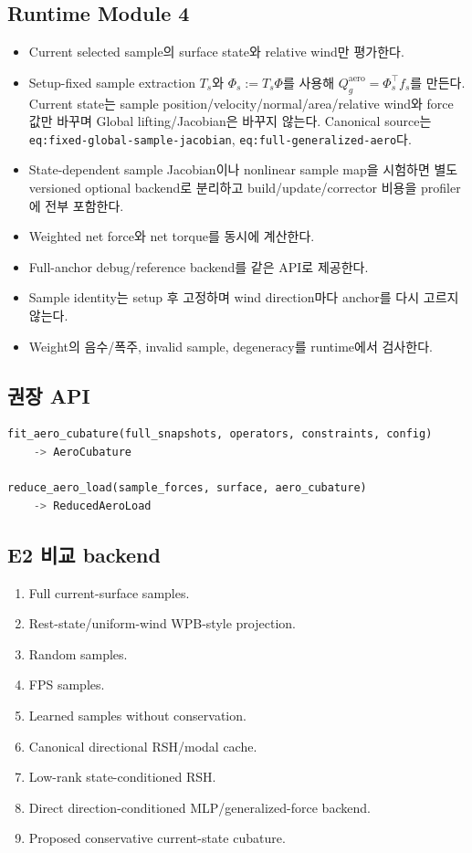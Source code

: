 \documentclass[10pt,a4paper]{article}
\newcommand{\todo}{\textcolor{TodoGray}{\(\square\)}}
\newcommand{\code}[1]{\texttt{#1}}
\begin{document}
\subsection*{Runtime Module 4}

\begin{itemize}
  \item[\todo] Current selected sample의 surface state와 relative wind만 평가한다.
  \item[\todo] Setup-fixed sample extraction \(T_s\)와
  \(\Phi_s:=T_s\Phi\)를 사용해 \(Q_g^{\mathrm{aero}}=\Phi_s^\top f_s\)를 만든다.
  Current state는 sample position/velocity/normal/area/relative wind와 force 값만 바꾸며
  Global lifting/Jacobian은 바꾸지 않는다. Canonical source는
  \code{eq:fixed-global-sample-jacobian}, \code{eq:full-generalized-aero}다.
  \item[\todo] State-dependent sample Jacobian이나 nonlinear sample map을 시험하면
  별도 versioned optional backend로 분리하고 build/update/corrector 비용을 profiler에 전부 포함한다.
  \item[\todo] Weighted net force와 net torque를 동시에 계산한다.
  \item[\todo] Full-anchor debug/reference backend를 같은 API로 제공한다.
  \item[\todo] Sample identity는 setup 후 고정하며 wind direction마다 anchor를 다시 고르지 않는다.
  \item[\todo] Weight의 음수/폭주, invalid sample, degeneracy를 runtime에서 검사한다.
\end{itemize}

\subsection*{권장 API}

\begin{lstlisting}[language=Python]
fit_aero_cubature(full_snapshots, operators, constraints, config)
    -> AeroCubature

reduce_aero_load(sample_forces, surface, aero_cubature)
    -> ReducedAeroLoad
\end{lstlisting}

\subsection*{E2 비교 backend}

\begin{enumerate}
  \item Full current-surface samples.
  \item Rest-state/uniform-wind WPB-style projection.
  \item Random samples.
  \item FPS samples.
  \item Learned samples without conservation.
  \item Canonical directional RSH/modal cache.
  \item Low-rank state-conditioned RSH.
  \item Direct direction-conditioned MLP/generalized-force backend.
  \item Proposed conservative current-state cubature.
\end{enumerate}
\end{document}
